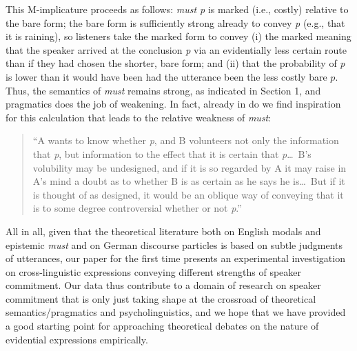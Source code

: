 \documentclass[11pt]{article}
\begin{document}
This M-implicature proceeds as follows: \emph{must p} is marked (i.e., costly) relative to the bare form; the bare form is sufficiently strong already to convey \emph{p} (e.g., that it is raining), so listeners take the marked form to convey (i) the marked meaning that the speaker arrived at the conclusion \emph{p} via an evidentially less certain route than if they had chosen the shorter, bare form; and (ii) that the probability of \emph{p} is lower than it would have been had the utterance been the less costly bare $p$. Thus, the semantics of \emph{must} remains strong, as indicated in Section 1, and pragmatics does the job of weakening. In fact, already in \citet[pp.~33--34]{grice1989} do we find inspiration for this calculation that leads to the relative weakness of \emph{must}:

\begin{quotation}
``A wants to know whether \emph{p}, and B volunteers not only the information that \emph{p}, but information to the effect that it is certain that \emph{p}\ldots\ B's volubility may be undesigned, and if it is so regarded by A it may raise in A's mind a doubt as to whether B is as certain as he says he is\ldots\ But if it is thought of as designed, it would be an oblique way of conveying that it is to some degree controversial whether or not \emph{p}.''
\end{quotation}


All in all, given that the theoretical literature both on English modals and epistemic \emph{must} and on German discourse particles is based on subtle judgments of utterances, our paper for the first time presents an experimental investigation on cross-linguistic expressions conveying different strengths of speaker commitment. Our data thus contribute to a domain of research on speaker commitment that is only just taking shape at the crossroad of theoretical semantics/pragmatics and psycholinguistics, and we hope that we have provided a good starting point for approaching theoretical debates on the nature of evidential expressions empirically.
\end{document}
